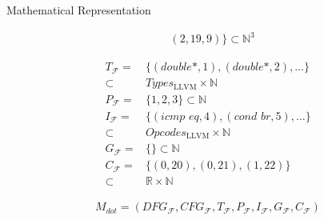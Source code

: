 \begin{blackbox}{Mathematical Representation}
\begin{minipage}{0.329\textwidth}
\begin{graybox}
\begin{align*}
                  &(2,19,9)\}\subset\mathbb N^3
            \end{align*}
        \end{graybox}
    \end{minipage}
    \begin{minipage}{0.329\textwidth}
        \centering
        \begin{graybox}
            \scriptsize
            \setlength{\abovedisplayskip}{0pt}
            \setlength{\belowdisplayskip}{0pt}
            \vspace{-0.5em}
            \begin{align*}
                T_\mathcal F={}&\{(\textit{double*},1),(\textit{double*},2),\dots\}\\[-0.5em]
                      \subset{}&Types_\text{LLVM}\times\mathbb N\\[-0.25em]
                P_\mathcal F={}&\{1,2,3\}\subset\mathbb N\\[-0.25em]
                I_\mathcal F={}&\{(\textit{icmp eq},4),(\textit{cond br},5),\dots\}\\[-0.5em]
                      \subset{}&Opcodes_\text{LLVM}\times\mathbb N\\[-0.25em]
                G_\mathcal F={}&\{\}\subset\mathbb N\\[-0.25em]
                C_\mathcal F={}&\{(0,20),(0,21),(1,22)\}\\[-0.5em]
                      \subset{}&\mathbb R\times\mathbb N
            \end{align*}

            \vspace{0.45em}
        \end{graybox}
    \end{minipage}

    \begin{minipage}{0.55\textwidth}
        \begin{graybox}
            \setlength{\abovedisplayskip}{0pt}
            \setlength{\belowdisplayskip}{0pt}
            \vspace{-0.5em}
            \begin{align*}
                M_{dot}=(DFG_\mathcal{F},
                 CFG_\mathcal{F},
                 T_\mathcal{F},
                 P_\mathcal{F},
                 I_\mathcal{F},
                 G_\mathcal{F},
                 C_\mathcal{F})
            \end{align*}
        \end{graybox}
    \end{minipage}
\end{blackbox}